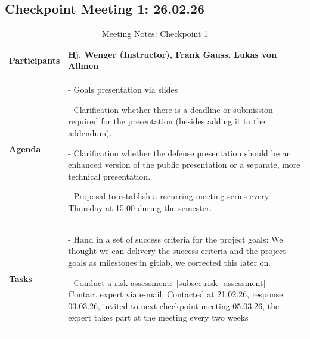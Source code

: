 \subsection{Checkpoint Meeting 1: 26.02.26}\label{subsec:checkpoint-meeting-1}

\begin{table}[H]
	\centering
	\begin{tabular}{p{2.5cm}|p{10cm}}

		\textbf{Participants} &
		Hj. Wenger (Instructor), Frank Gauss, Lukas von Allmen \\
		\hline

		\textbf{Agenda} &
		- Goals presentation via slides\par
		- Clarification whether there is a deadline or submission required for the presentation (besides adding it to the addendum).\par
		- Clarification whether the defense presentation should be an enhanced version of the public presentation or a separate, more technical presentation.\par
		- Proposal to establish a recurring meeting series every Thursday at 15:00 during the semester. \\
		\hline

		\textbf{Tasks} &
		- Hand in a set of success criteria for the project goals: We thought we can delivery the success criteria and the project goals as milestones in gitlab, we corrected this later on.\par
		- Conduct a risk assessment:~\ref{subsec:risk_assessment} \newline
		- Contact expert via e-mail: Contacted at 21.02.26, response 03.03.26, invited to next checkpoint meeting 05.03.26, the expert takes part at the meeting every two weeks


	\end{tabular}
	\caption{Meeting Notes: Checkpoint 1}
	\label{tab:meeting-notes-checkpoint1}
\end{table}
